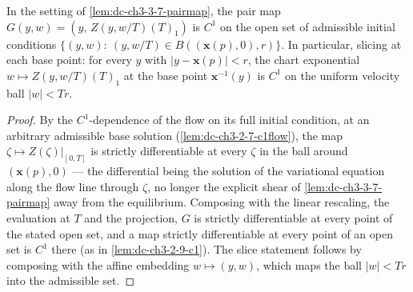 \begin{lemma}
  \label{lem:dc-ch3-3-7-c1pair}


  In the setting of \cref{lem:dc-ch3-3-7-pairmap}, the pair map
  $G(y,w)=(y,\,Z(y,w/T)(T)_1)$ is $C^1$ on the open set of admissible initial
  conditions $\{(y,w):\ (y,w/T)\in B((\mathbf{x}(p),0),r)\}$. In particular,
  slicing at each base point: for every $y$ with $|y-\mathbf{x}(p)|<r$, the
  chart exponential $w\mapsto Z(y,w/T)(T)_1$ at the base point
  $\mathbf{x}^{-1}(y)$ is $C^1$ on the uniform velocity ball $|w|<Tr$.
\end{lemma}
\begin{proof}
  \sketch

  By the $C^1$-dependence of the flow on its full initial condition, at an
  arbitrary admissible base solution (\cref{lem:dc-ch3-2-7-c1flow}), the map
  $\zeta\mapsto Z(\zeta)|_{[0,T]}$ is strictly differentiable at every $\zeta$
  in the ball around $(\mathbf{x}(p),0)$ — the differential being the solution
  of the variational equation along the flow line through $\zeta$, no longer
  the explicit shear of \cref{lem:dc-ch3-3-7-pairmap} away from the
  equilibrium. Composing with the linear rescaling, the evaluation at $T$ and
  the projection, $G$ is strictly differentiable at every point of the stated
  open set, and a map strictly differentiable at every point of an open set is
  $C^1$ there (as in \cref{lem:dc-ch3-2-9-c1}). The slice statement follows by
  composing with the affine embedding $w\mapsto(y,w)$, which maps the ball
  $|w|<Tr$ into the admissible set.
\end{proof}

